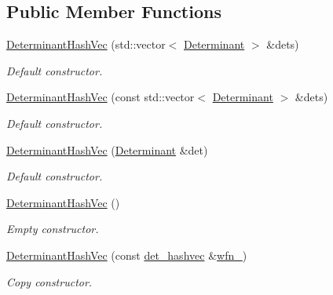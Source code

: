 \subsection*{Public Member Functions}
\begin{DoxyCompactItemize}
\item 
\mbox{\hyperlink{classforte_1_1_determinant_hash_vec_aa09d2d81e23e9a1cdfbc6b595bb46a14}{Determinant\+Hash\+Vec}} (std\+::vector$<$ \mbox{\hyperlink{namespaceforte_a2076c63fd7b8732004d9e1442ce527c1}{Determinant}} $>$ \&dets)
\begin{DoxyCompactList}\small\item\em Default constructor. \end{DoxyCompactList}\item 
\mbox{\hyperlink{classforte_1_1_determinant_hash_vec_a70682499ebdecf59a21a65536bef6419}{Determinant\+Hash\+Vec}} (const std\+::vector$<$ \mbox{\hyperlink{namespaceforte_a2076c63fd7b8732004d9e1442ce527c1}{Determinant}} $>$ \&dets)
\begin{DoxyCompactList}\small\item\em Default constructor. \end{DoxyCompactList}\item 
\mbox{\hyperlink{classforte_1_1_determinant_hash_vec_a2ab88d1ebf6df4232f3a3d89470c2cab}{Determinant\+Hash\+Vec}} (\mbox{\hyperlink{namespaceforte_a2076c63fd7b8732004d9e1442ce527c1}{Determinant}} \&det)
\begin{DoxyCompactList}\small\item\em Default constructor. \end{DoxyCompactList}\item 
\mbox{\hyperlink{classforte_1_1_determinant_hash_vec_ac5f95a20bc269024fc948691b0326fc4}{Determinant\+Hash\+Vec}} ()
\begin{DoxyCompactList}\small\item\em Empty constructor. \end{DoxyCompactList}\item 
\mbox{\hyperlink{classforte_1_1_determinant_hash_vec_a3cd276dee3ee8a023104f1dc0224e941}{Determinant\+Hash\+Vec}} (const \mbox{\hyperlink{namespaceforte_aee00ff2f656f0aa613d3f9f1ba01cad5}{det\+\_\+hashvec}} \&\mbox{\hyperlink{classforte_1_1_determinant_hash_vec_abbbb485c33b1f107c3cafef27cdf5215}{wfn\+\_\+}})
\begin{DoxyCompactList}\small\item\em Copy constructor. \end{DoxyCompactList}\item 

\end{DoxyCompactItemize}

